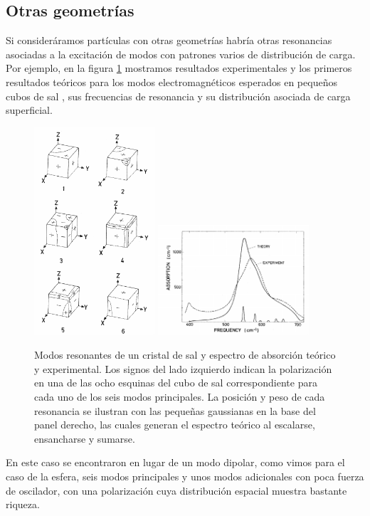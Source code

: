 \documentclass[12pt]{article}
\begin{document}
\subsection{Otras geometrías}
Si consideráramos partículas con otras geometrías habría otras
resonancias asociadas a la excitación de modos con patrones varios de
distribución de carga. Por ejemplo, en la figura \ref{fig:Fuchs}
mostramos resultados experimentales y los primeros resultados teóricos
para los modos electromagnéticos esperados en pequeños cubos de sal
\cite{Fuchs}, sus frecuencias de resonancia y su distribución asociada
de carga superficial.
\begin{figure}
  \centering
  \includegraphics[width=0.4\textwidth]{fuchs1}
  \includegraphics[width=0.5\textwidth]{fuchs2}
  \caption{Modos resonantes de un cristal de sal y espectro de
    absorción teórico y experimental.  Los
    signos del lado izquierdo indican la polarización en una de las
    ocho esquinas del cubo de sal correspondiente para cada uno de los
    seis modos principales. La posición y peso de cada resonancia se
    ilustran con las pequeñas gaussianas en la base del panel
    derecho, las cuales generan el espectro teórico al escalarse,
    ensancharse y sumarse.}
  \label{fig:Fuchs}
\end{figure}
En este caso se encontraron en lugar de un modo dipolar, como vimos
para el caso de la esfera, seis modos principales y unos modos
adicionales con poca fuerza de oscilador, con una polarización cuya
distribución espacial muestra bastante riqueza.
\end{document}
